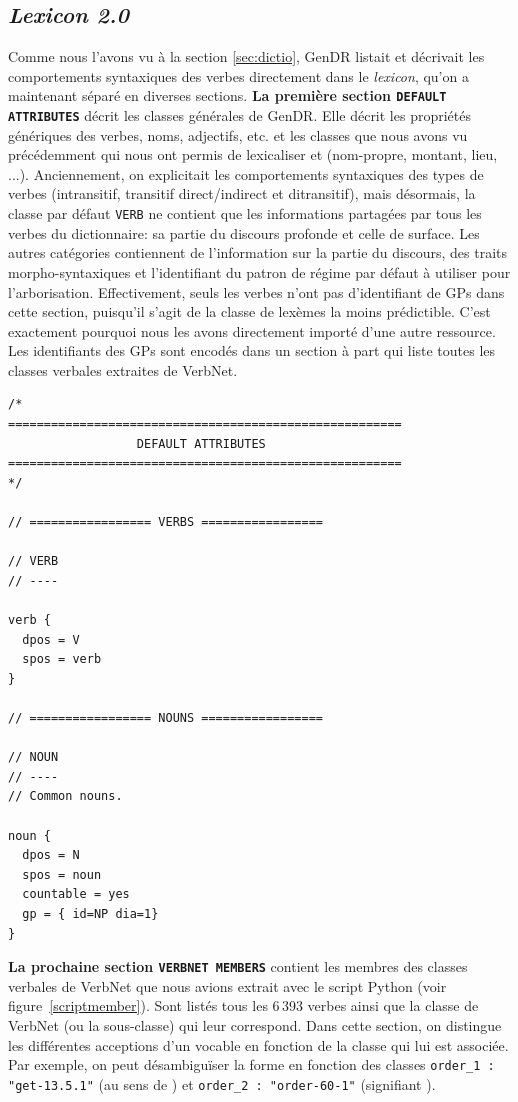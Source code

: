 \subsection{\emph{Lexicon 2.0}}
Comme nous l'avons vu à la section \ref{sec:dictio}, GenDR listait et décrivait les comportements syntaxiques des verbes directement dans le \emph{lexicon}, qu'on a maintenant séparé en diverses sections. \textbf{La première section \texttt{DEFAULT ATTRIBUTES}} décrit les classes générales de GenDR. Elle décrit les propriétés génériques des verbes, noms,  adjectifs, etc. et les classes que nous avons vu précédemment qui nous ont permis de lexicaliser  et  (nom-propre, montant, lieu, ...). Anciennement, on explicitait les comportements syntaxiques des types de verbes (intransitif, transitif direct/indirect et ditransitif), mais désormais, la classe par défaut \texttt{VERB} ne contient que les informations partagées par tous les verbes du dictionnaire: sa partie du discours profonde et celle de surface. Les autres catégories contiennent de l'information sur la partie du discours, des traits morpho-syntaxiques et l'identifiant du patron de régime par défaut à utiliser pour l'arborisation. Effectivement, seuls les verbes n'ont pas d'identifiant de \acp{GP} dans cette section, puisqu'il s'agit de la classe de lexèmes la moins prédictible. C'est exactement pourquoi nous les avons directement importé d'une autre ressource. Les identifiants des \acp{GP} sont encodés dans un section à part qui liste toutes les classes verbales extraites de VerbNet.

\begin{lstlisting}[language=XML, caption = Attributs par défaut des classes génériques, label=classedef]
/*
=======================================================
                  DEFAULT ATTRIBUTES
=======================================================
*/

// ================= VERBS =================

// VERB
// ----

verb {
  dpos = V
  spos = verb
}

// ================= NOUNS =================

// NOUN
// ----
// Common nouns.

noun {
  dpos = N
  spos = noun
  countable = yes
  gp = { id=NP dia=1}
}
\end{lstlisting}

\textbf{La prochaine section \texttt{VERBNET MEMBERS}} contient les membres des classes verbales de VerbNet que nous avions extrait avec le script Python (voir figure~\ref{scriptmember}). Sont listés tous les 6\,393 verbes ainsi que la classe de VerbNet (ou la sous-classe) qui leur correspond. Dans cette section, on distingue les différentes acceptions d'un vocable en fonction de la classe qui lui est associée. Par exemple, on peut désambiguïser la forme  en fonction des classes \texttt{order\_1 : "get-13.5.1"} (au sens de ) et \texttt{order\_2 : "order-60-1"} (signifiant ).

